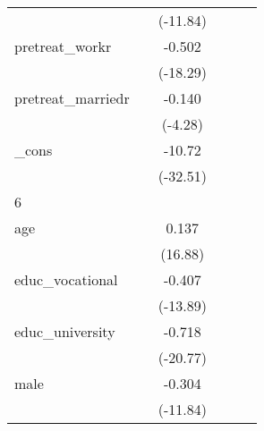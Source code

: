 {\begin{tabular}{l*{5}{c}}
            &                     &    (-11.84)         &                     &                     &                     \\
[1em]
pretreat\_workr&                     &      -0.502\sym{***}&                     &                     &                     \\
            &                     &    (-18.29)         &                     &                     &                     \\
[1em]
pretreat\_marriedr&                     &      -0.140\sym{***}&                     &                     &                     \\
            &                     &     (-4.28)         &                     &                     &                     \\
[1em]
\_cons      &                     &      -10.72\sym{***}&                     &                     &                     \\
            &                     &    (-32.51)         &                     &                     &                     \\
\hline
6           &                     &                     &                     &                     &                     \\
age         &                     &       0.137\sym{***}&                     &                     &                     \\
            &                     &     (16.88)         &                     &                     &                     \\
[1em]
educ\_vocational&                     &      -0.407\sym{***}&                     &                     &                     \\
            &                     &    (-13.89)         &                     &                     &                     \\
[1em]
educ\_university&                     &      -0.718\sym{***}&                     &                     &                     \\
            &                     &    (-20.77)         &                     &                     &                     \\
[1em]
male        &                     &      -0.304\sym{***}&                     &                     &                     \\
            &                     &    (-11.84)         &                     &                     &                     \\

\end{tabular}}

